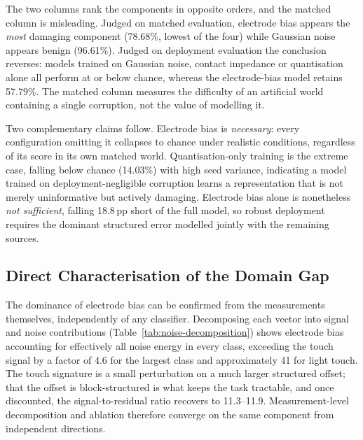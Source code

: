 The two columns rank the components in opposite orders, and the matched column is misleading. Judged on matched evaluation, electrode bias appears the \emph{most} damaging component (78.68\%, lowest of the four) while Gaussian noise appears benign (96.61\%). Judged on deployment evaluation the conclusion reverses: models trained on Gaussian noise, contact impedance or quantisation alone all perform at or below chance, whereas the electrode-bias model retains 57.79\%. The matched column measures the difficulty of an artificial world containing a single corruption, not the value of modelling it.

Two complementary claims follow. Electrode bias is \emph{necessary}: every configuration omitting it collapses to chance under realistic conditions, regardless of its score in its own matched world. Quantisation-only training is the extreme case, falling below chance (14.03\%) with high seed variance, indicating a model trained on deployment-negligible corruption learns a representation that is not merely uninformative but actively damaging. Electrode bias alone is nonetheless \emph{not sufficient}, falling 18.8\,pp short of the full model, so robust deployment requires the dominant structured error modelled jointly with the remaining sources.

\subsection{Direct Characterisation of the Domain Gap}
\label{sec:res-domain}

The dominance of electrode bias can be confirmed from the measurements themselves, independently of any classifier. Decomposing each vector into signal and noise contributions (Table~\ref{tab:noise-decomposition}) shows electrode bias accounting for effectively all noise energy in every class, exceeding the touch signal by a factor of 4.6 for the largest class and approximately 41 for light touch. The touch signature is a small perturbation on a much larger structured offset; that the offset is block-structured is what keeps the task tractable, and once discounted, the signal-to-residual ratio recovers to 11.3--11.9. Measurement-level decomposition and ablation therefore converge on the same component from independent directions.

